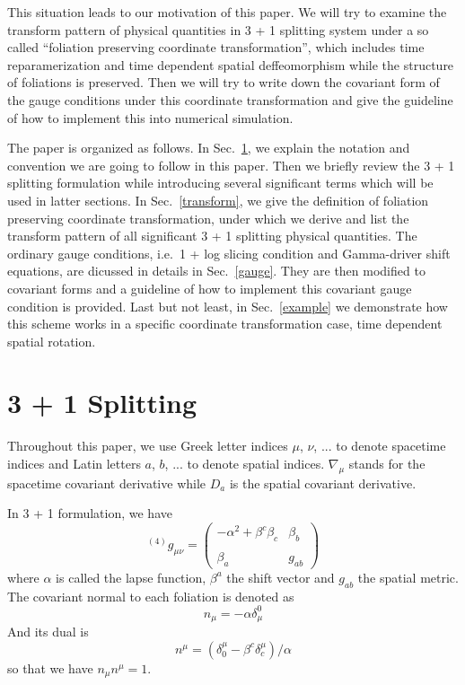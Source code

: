 \documentclass[letterpaper,nofootinbib,prd,amsmath,onecolumn]{revtex4-1}
\begin{document}
This situation leads to our motivation of this paper. We will try to examine the transform pattern of physical quantities in 3 + 1 splitting system under a so called ``foliation preserving coordinate transformation'', which includes time reparamerization and time dependent spatial deffeomorphism while the structure of foliations is preserved. Then we will try to write down the covariant form of the gauge conditions under this coordinate transformation and give the guideline of how to implement this into numerical simulation. 

The paper is organized as follows. In Sec.~\ref{3+1}, we explain the notation and convention we are going to follow in this paper. Then we briefly review the 3 + 1 splitting formulation while introducing several significant terms which will be used in latter sections. In Sec.~\ref{transform}, we give the definition of foliation preserving coordinate transformation, under which we derive and list the transform pattern of all significant 3 + 1 splitting physical quantities. The ordinary gauge conditions, i.e.~1 + log slicing condition and Gamma-driver shift equations, are dicussed in details in Sec.~\ref{gauge}. They are then modified to covariant forms and a guideline of how to implement this covariant gauge condition is provided. Last but not least, in Sec.~\ref{example} we demonstrate how this scheme works in a specific coordinate transformation case, time dependent spatial rotation.
\section{3 + 1 Splitting}\label{3+1}
Throughout this paper, we use Greek letter indices $\mu$, $\nu$, ... to denote spacetime indices and Latin letters $a$, $b$, ... to denote spatial indices. $\nabla_{\mu}$ stands for the spacetime covariant derivative while $D_{a}$ is the spatial covariant derivative.

In 3 + 1 formulation, we have
\begin{equation*}
^{(4)}g_{\mu\nu} = \begin{pmatrix}-\alpha^2 + \beta^{c}\beta_{c} & \beta_{b}\\\\\beta_{a} & g_{ab}\end{pmatrix}
\end{equation*}
where $\alpha$ is called the lapse function, $\beta^{a}$ the shift vector and $g_{ab}$ the spatial metric. The covariant normal to each foliation is denoted as
\begin{equation}\label{normal covector}
n_{\mu} = -\alpha\delta^{0}_{\mu}
\end{equation}
 And its dual is
\begin{equation}\label{normal vector}
n^{\mu} = (\delta^{\mu}_{0} - \beta^{c}\delta^{\mu}_{c})/\alpha
\end{equation}
so that we have $n_{\mu}n^{\mu} = 1$. 
\end{document}
